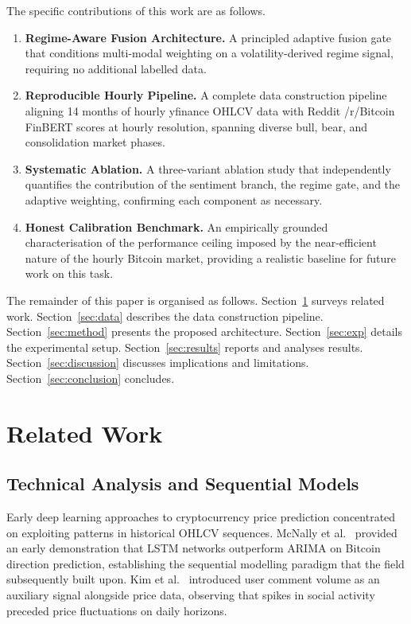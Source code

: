 \documentclass[journal]{IEEEtran}
\begin{document}
The specific contributions of this work are as follows.
\begin{enumerate}
  \item \textbf{Regime-Aware Fusion Architecture.} A principled adaptive fusion
        gate that conditions multi-modal weighting on a volatility-derived regime
        signal, requiring no additional labelled data.
  \item \textbf{Reproducible Hourly Pipeline.} A complete data construction
        pipeline aligning 14 months of hourly yfinance OHLCV data with
        Reddit /r/Bitcoin FinBERT scores at hourly resolution, spanning diverse
        bull, bear, and consolidation market phases.
  \item \textbf{Systematic Ablation.} A three-variant ablation study that
        independently quantifies the contribution of the sentiment branch, the
        regime gate, and the adaptive weighting, confirming each component as
        necessary.
  \item \textbf{Honest Calibration Benchmark.} An empirically grounded
        characterisation of the performance ceiling imposed by the near-efficient
        nature of the hourly Bitcoin market, providing a realistic baseline for
        future work on this task.
\end{enumerate}

The remainder of this paper is organised as follows.
Section~\ref{sec:related} surveys related work.
Section~\ref{sec:data} describes the data construction pipeline.
Section~\ref{sec:method} presents the proposed architecture.
Section~\ref{sec:exp} details the experimental setup.
Section~\ref{sec:results} reports and analyses results.
Section~\ref{sec:discussion} discusses implications and limitations.
Section~\ref{sec:conclusion} concludes.

\section{Related Work}
\label{sec:related}

\subsection{Technical Analysis and Sequential Models}
Early deep learning approaches to cryptocurrency price prediction
concentrated on exploiting patterns in historical OHLCV sequences.
McNally et al.~\cite{mcnally2018predicting} provided an early demonstration
that LSTM networks outperform ARIMA on Bitcoin direction prediction, establishing
the sequential modelling paradigm that the field subsequently built upon.
Kim et al.~\cite{kim2018predicting} introduced user comment volume as an
auxiliary signal alongside price data, observing that spikes in social activity
preceded price fluctuations on daily horizons.
\end{document}
